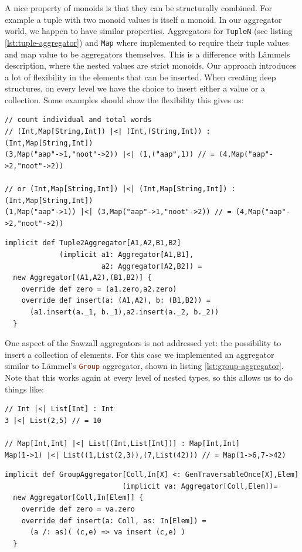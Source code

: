 \documentclass[10pt,a4paper]{article}
\begin{document}
A nice property of monoids is that they can be structurally combined. For example a tuple with two monoid values is itself a monoid. In our aggregator world, we happen to have similar properties. Aggregators for \lstinline|TupleN| (see listing \ref{lst:tuple-aggregator}) and \lstinline|Map| where implemented to require their tuple values and map value to be aggregators themselves. This is a difference with L\"ammels description, where the nested values are strict monoids. Our approach introduces a lot of flexibility in the elements that can be inserted. When creating deep structures, on every level we have the choice to insert either a value or a collection. Some examples should show the flexibility this gives us:
\begin{lstlisting}
// count individual and total words
// (Int,Map[String,Int]) |<| (Int,(String,Int)) : (Int,Map[String,Int])
(3,Map("aap"->1,"noot"->2)) |<| (1,("aap",1)) // = (4,Map("aap"->2,"noot"->2))

// or (Int,Map[String,Int]) |<| (Int,Map[String,Int]) : (Int,Map[String,Int])
(1,Map("aap"->1)) |<| (3,Map("aap"->1,"noot"->2)) // = (4,Map("aap"->2,"noot"->2))
\end{lstlisting}

\begin{lstlisting}[float,frame=tb,caption=Aggregator for tuple,label=lst:tuple-aggregator]
implicit def Tuple2Aggregator[A1,A2,B1,B2]
             (implicit a1: Aggregator[A1,B1],
                       a2: Aggregator[A2,B2]) =
  new Aggregator[(A1,A2),(B1,B2)] {
    override def zero = (a1.zero,a2.zero)
    override def insert(a: (A1,A2), b: (B1,B2)) =
      (a1.insert(a._1, b._1),a2.insert(a._2, b._2))
  }
\end{lstlisting}

One aspect of the Sawzall aggregators is not addressed yet: the possibility to insert a collection of elements. For this case we implemented an aggregator similar to L\"ammel's \lstinline[language=haskell]|Group| aggregator, shown in listing \ref{lst:group-aggregator}. Note that this works again at every level of nested types, so this allows us to do things like:
\begin{lstlisting}
// Int |<| List[Int] : Int
3 |<| List(2,5) // = 10

// Map[Int,Int] |<| List[(Int,List[Int])] : Map[Int,Int]
Map(1->1) |<| List((1,List(2,3)),(7,List(42))) // = Map(1->6,7->42)
\end{lstlisting}

\begin{lstlisting}[float,frame=tb,caption=Aggregator for collections of elements,label=lst:group-aggregator]
implicit def GroupAggregator[Coll,In[X] <: GenTraversableOnce[X],Elem]
                            (implicit va: Aggregator[Coll,Elem])=
  new Aggregator[Coll,In[Elem]] {
    override def zero = va.zero
    override def insert(a: Coll, as: In[Elem]) =
      (a /: as)( (c,e) => va insert (c,e) )
  }
\end{lstlisting}
\end{document}
